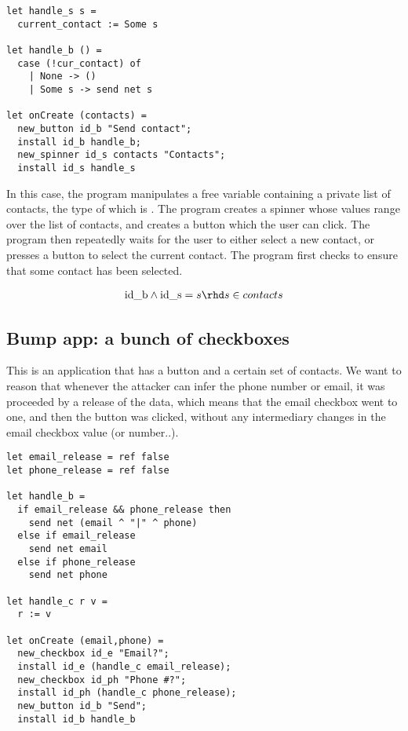 \documentclass{sig-alternate}
\newcommand{\code}[1]{\text{\lstinline!#1!}}
\theoremstyle{definition}
\newcommand{\trelease}{\rhd}
\begin{document}
{\begin{lstlisting}
let handle_s s =
  current_contact := Some s

let handle_b () =
  case (!cur_contact) of
    | None -> ()
    | Some s -> send net s

let onCreate (contacts) = 
  new_button id_b "Send contact";
  install id_b handle_b;
  new_spinner id_s contacts "Contacts";
  install id_s handle_s
\end{lstlisting}

In this case, the program manipulates a free variable containing a
private list of contacts, the type of which is \code{list(string)}.
The program creates a spinner whose values range over the list of
contacts, and creates a button which the user can click.  The program
then repeatedly waits for the user to either select a new contact, or
presses a button to select the current contact.  The program first
checks to ensure that some contact has been selected.

\begin{displaymath}
  \begin{array}{c}
    \code{id_b} \wedge \code{id_s} = {s}
    \trelease
    s \in contacts
  \end{array}
\end{displaymath}

\subsection{Bump app: a bunch of checkboxes}

This is an application that has a button and a certain set of
contacts.  We want to reason that whenever the attacker can infer the
phone number or email, it was proceeded by a release of the data,
which means that the email checkbox went to one, and then the button
was clicked, without any intermediary changes in the email checkbox
value (or number..).

\begin{lstlisting}
let email_release = ref false
let phone_release = ref false

let handle_b =
  if email_release && phone_release then
    send net (email ^ "|" ^ phone)
  else if email_release
    send net email
  else if phone_release
    send net phone

let handle_c r v =
  r := v
    
let onCreate (email,phone) = 
  new_checkbox id_e "Email?";
  install id_e (handle_c email_release);
  new_checkbox id_ph "Phone #?";
  install id_ph (handle_c phone_release);
  new_button id_b "Send";
  install id_b handle_b
\end{lstlisting}

}
\end{document}
